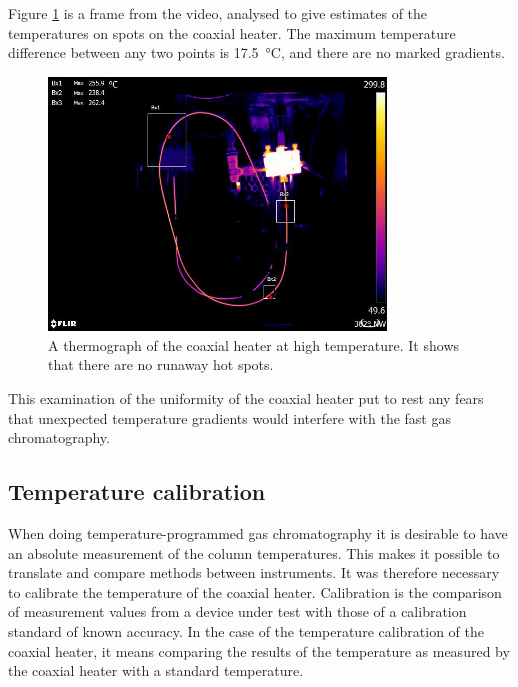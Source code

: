 Figure \ref{fig:ThermalImage} is a frame from the video, analysed to give
estimates of the temperatures on spots on the coaxial heater. The maximum
temperature difference between any two points is \SI{17.5}{\celsius}, and there
are no marked gradients.

\begin{figure}
	\centering
	\includegraphics[width=0.8\textwidth]{./Figures/ThermalImage}
	\decoRule
	
\caption[A thermograph of the coaxial heater at temperature]{A thermograph of
the coaxial heater at high temperature. It shows that there are no runaway hot
spots.}
	
	\label{fig:ThermalImage}
\end{figure}

This examination of the uniformity of the coaxial heater put to rest any fears
that unexpected temperature gradients would interfere with the fast gas
chromatography.

\subsection{Temperature calibration}

When doing temperature-programmed gas chromatography it is desirable to have an
absolute measurement of the column temperatures. This makes it possible to
translate and compare methods between instruments. It was therefore necessary to
calibrate the temperature of the coaxial heater. Calibration is the comparison
of measurement values from a device under test with those of a calibration
standard of known accuracy. In the case of the temperature calibration of the
coaxial heater, it means comparing the results of the temperature as measured by
the coaxial heater with a standard temperature.

